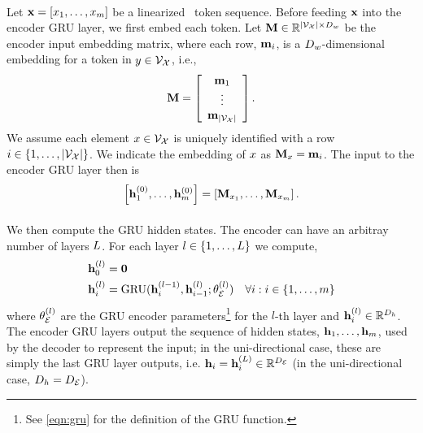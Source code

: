 \paragraph{}
Let $\mathbf{x} = \left[ x_1,\ldots,x_{m}\right]$ be a linearized
\meaningrepresentation~token sequence. Before feeding $\mathbf{x}$ into the
encoder GRU layer, we first embed each token. Let $\mathbf{M} \in
\mathbb{R}^{{\left\vert \mathcal{V}_{\mathcal{X}} \right\vert} \times D_{w}}$ be the encoder input embedding
matrix, where each row, $\mathbf{m}_i$, is a $D_{w}$-dimensional embedding
for a token in $y \in \mathcal{V}_{\mathcal{X}}$, i.e.,
\[ 
    \mathbf{M} = \left[ \begin{array}{c} \mathbf{m}_1\\ \vdots \\ \mathbf{m}_{\left\vert \mathcal{V}_{\mathcal{X}} \right\vert} \end{array}\right]. 
\]
We assume each element $x \in \mathcal{V}_{\mathcal{X}}$ is uniquely identified with a row
$i \in \left\{1, \ldots, {\left\vert \mathcal{V}_{\mathcal{X}} \right\vert}\right\}$. We indicate the
embedding of $x$ as $\mathbf{M}_{x} = \mathbf{m}_i$.  The input to the
encoder GRU layer then is 
\[
\left[\mathbf{h}^{(0)}_1,\ldots,\mathbf{h}^{(0)}_{m}\right] = 
    \left[\mathbf{M}_{x_1},\ldots,   \mathbf{M}_{x_{m}}\right]. 
\]


\paragraph{}
We then compute the GRU hidden states. The encoder can have an arbitray number of layers $L$.
For each layer $l \in \{1,\ldots, L\}$ we compute,
\begin{align*}
    \mathbf{h}_0^{(l)} & = \mathbf{0} \\
    \mathbf{h}_i^{(l)} & =\operatorname{GRU}(\mathbf{h}_i^{(l - 1)}, \mathbf{h}_{i-1}^{(l)}; \theta_\mathcal{E}^{(l)}) & \forall i : i \in \{1,\ldots, m\}
\end{align*}
where $\theta_\mathcal{E}^{(l)}$ are the GRU encoder parameters\footnote{See \autoref{eqn:gru} for the definition of the GRU function.} for the $l$-th layer and $\mathbf{h}^{(l)}_i \in \mathbb{R}^{D_{h}}$. The encoder GRU layers output the 
sequence of hidden states, $\mathbf{h}_1,\ldots,\mathbf{h}_{m}$, used by the decoder to represent the input; 
in the uni-directional case, these are simply the last GRU layer outputs, i.e. $\mathbf{h}_i = \mathbf{h}_i^{(L)} \in \mathbb{R}^{{D_\mathcal{E}}}$ (in the uni-directional case, $D_{h} = {D_\mathcal{E}}$).

